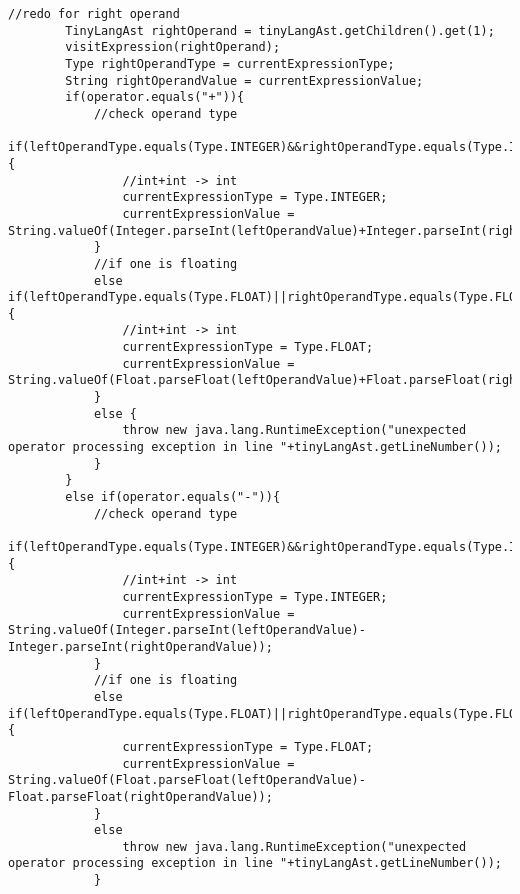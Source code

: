 \begin{lstlisting}[basicstyle=\miniscule,caption=Interpreter,label=listing:interpreter]
		//redo for right operand
		TinyLangAst rightOperand = tinyLangAst.getChildren().get(1);
		visitExpression(rightOperand);
		Type rightOperandType = currentExpressionType;
		String rightOperandValue = currentExpressionValue;
		if(operator.equals("+")){
			//check operand type
			if(leftOperandType.equals(Type.INTEGER)&&rightOperandType.equals(Type.INTEGER)) {
				//int+int -> int
				currentExpressionType = Type.INTEGER;
				currentExpressionValue = String.valueOf(Integer.parseInt(leftOperandValue)+Integer.parseInt(rightOperandValue));
			}
			//if one is floating 
			else if(leftOperandType.equals(Type.FLOAT)||rightOperandType.equals(Type.FLOAT)) {
				//int+int -> int
				currentExpressionType = Type.FLOAT;
				currentExpressionValue = String.valueOf(Float.parseFloat(leftOperandValue)+Float.parseFloat(rightOperandValue));
			}
			else {
				throw new java.lang.RuntimeException("unexpected operator processing exception in line "+tinyLangAst.getLineNumber());
			}
		}
		else if(operator.equals("-")){
			//check operand type
			if(leftOperandType.equals(Type.INTEGER)&&rightOperandType.equals(Type.INTEGER)) {
				//int+int -> int
				currentExpressionType = Type.INTEGER;
				currentExpressionValue = String.valueOf(Integer.parseInt(leftOperandValue)-Integer.parseInt(rightOperandValue));
			}
			//if one is floating 
			else if(leftOperandType.equals(Type.FLOAT)||rightOperandType.equals(Type.FLOAT)) {
				currentExpressionType = Type.FLOAT;
				currentExpressionValue = String.valueOf(Float.parseFloat(leftOperandValue)-Float.parseFloat(rightOperandValue));
			}
			else
				throw new java.lang.RuntimeException("unexpected operator processing exception in line "+tinyLangAst.getLineNumber());
			}
		

\end{lstlisting}
